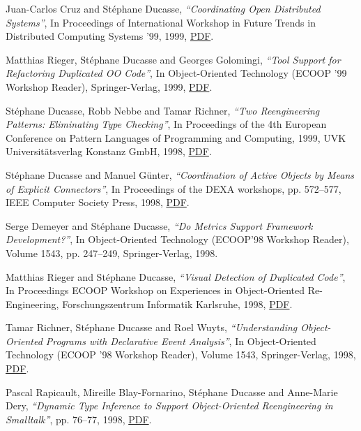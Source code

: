 \documentclass{article}
\newcommand{\czauthors}[1]{#1}
\newcommand{\cztitle}[1]{\emph{``#1''}}
\newcommand{\czbooktitle}[1]{#1}
\begin{document}
\begin{itemize}
	\pub  \czauthors{Juan-Carlos Cruz and St\'ephane Ducasse},  \cztitle{Coordinating Open Distributed Systems},  In \czbooktitle{Proceedings of International Workshop in Future Trends in Distributed Computing Systems '99}, 1999, \href{http://rmod-files.lille.inria.fr/Team/Texts/Papers/Cruz99-FTDCS.pdf}{PDF}.

	\pub  \czauthors{Matthias Rieger, St\'ephane Ducasse and Georges Golomingi},  \cztitle{Tool Support for Refactoring Duplicated OO Code},  In \czbooktitle{Object-Oriented Technology (ECOOP '99 Workshop Reader)}, Springer-Verlag, 1999, \href{http://rmod-files.lille.inria.fr/Team/Texts/Papers/Rieg99aToolSuppRefacOOCode.pdf}{PDF}.

	\pub  \czauthors{St\'ephane Ducasse, Robb Nebbe and Tamar Richner},  \cztitle{Two Reengineering Patterns: Eliminating Type Checking},  In \czbooktitle{Proceedings of the 4th European Conference on Pattern Languages of Programming and Computing, 1999}, UVK Universit\"atsverlag Konstanz GmbH, 1998, \href{http://rmod-files.lille.inria.fr/Team/Texts/Papers/Duca98bTwoReengPatterns.pdf}{PDF}.

	\pub  \czauthors{St\'ephane Ducasse and Manuel G{\"u}nter},  \cztitle{Coordination of Active Objects by Means of Explicit Connectors},  In \czbooktitle{Proceedings of the DEXA workshops}, pp. 572--577, IEEE Computer Society Press, 1998, \href{http://rmod-files.lille.inria.fr/Team/Texts/Papers/Duca98cExplicitConnectors.pdf}{PDF}.

	\pub  \czauthors{Serge Demeyer and St\'ephane Ducasse},  \cztitle{Do Metrics Support Framework Development?},  In \czbooktitle{Object-Oriented Technology (ECOOP'98 Workshop Reader)}, Volume 1543, pp. 247--249, Springer-Verlag, 1998.

	\pub  \czauthors{Matthias Rieger and St\'ephane Ducasse},  \cztitle{Visual Detection of Duplicated Code},  In \czbooktitle{Proceedings ECOOP Workshop on Experiences in Object-Oriented Re-Engineering}, Forschungszentrum Informatik Karlsruhe, 1998, \href{http://rmod-files.lille.inria.fr/Team/Texts/Papers/Rieg98aEcoopWorkshop.pdf}{PDF}.

	\pub  \czauthors{Tamar Richner, St\'ephane Ducasse and Roel Wuyts},  \cztitle{Understanding Object-Oriented Programs with Declarative Event Analysis},  In \czbooktitle{Object-Oriented Technology (ECOOP '98 Workshop Reader)}, Volume 1543, Springer-Verlag, 1998, \href{http://rmod-files.lille.inria.fr/Team/Texts/Papers/Rich98bEvents.pdf}{PDF}.

	\pub  \czauthors{Pascal Rapicault, Mireille Blay-Fornarino, St\'ephane Ducasse and Anne-Marie Dery},  \cztitle{Dynamic Type Inference to Support Object-Oriented Reengineering in Smalltalk}, pp. 76--77, 1998, \href{http://scg.unibe.ch/archive/famoos/Rapi98a/type.pdf}{PDF}.


\end{itemize}
\end{document}
